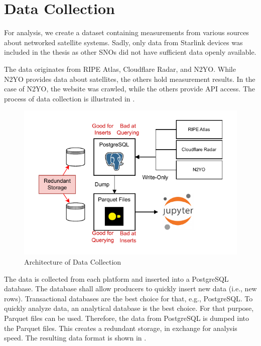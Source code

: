 \section{Data Collection} \label{sec:data-collection}

For analysis, we create a dataset containing measurements from various sources
about networked satellite systems. Sadly, only data from Starlink devices was
included in the thesis as other \ac{SNO}s did not have sufficient data openly
available.

The data originates from RIPE Atlas, Cloudflare Radar, and N2YO. While
N2YO provides data about satellites, the others hold measurement results. In
the case of N2YO, the website was crawled, while the others provide API
access. The process of data collection is illustrated in
.

\begin{figure}[h]
	\centering
	\includegraphics[width=\textwidth]{./chapters/3-methodology/img/architecture.drawio.pdf}
	\caption{Architecture of Data Collection}
	\label{fig:data-collection-process}
\end{figure}

The data is collected from each platform and inserted into a PostgreSQL
database. The database shall allow producers to quickly insert new data (i.e.,
new rows). Transactional databases are the best choice for that, e.g.,
PostgreSQL. To quickly analyze data, an analytical database is the best choice.
For that purpose, Parquet files can be used. Therefore, the data from
PostgreSQL is dumped into the Parquet files. This creates a redundant storage,
in exchange for analysis speed. The resulting data format is shown in
.

